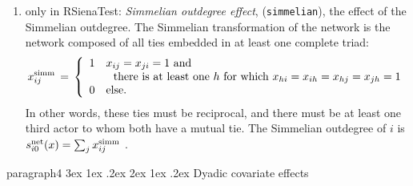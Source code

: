\documentclass[a4paper,fleqn,11pt]{article}
\makeatletter
\renewcommand\paragraph{\@startsection
   {paragraph}{4}{\z@}               %
   {3ex \@plus1ex \@minus.2ex}       %
   {2ex \@plus1ex \@minus.2ex}       %
   {\normalfont\normalsize\bfseries\itshape}}   %
\newcommand{\+}{\, + \,}
\newcommand{\vit}{\theenumi}
\newcounter{savenumi}
\makeatother
\begin{document}
\begin{enumerate}
\setcounter{enumi}{\value{savenumi}}
\item only in \textsf{RSienaTest}: \emph{Simmelian outdegree effect}, (\texttt{simmelian}), the effect of
      the Simmelian outdegree. The Simmelian transformation of the network is
      the network composed of all ties embedded in at least one complete triad:
\[
    x^{\rm{simm}}_{ij} \,=\, \left\{ \begin{array}{cl}
                               1 & x_{ij} = x_{ji} = 1 \text{ and} \\
                                  & \ \text{ there is at least one }
                                      h \text{ for which } x_{hi} = x_{ih} = x_{hj} = x_{jh} = 1 \\
                               0 & \text{else.}
                             \end{array} \right.
\]
      In other words, these ties must be reciprocal, and there must be at least one
      third actor to whom both have a mutual tie.
      The Simmelian outdegree of $i$ is  \\
$s^{\rm net}_{i\vit}(x ) = \sum_j  x^{\rm{simm}}_{ij} $ .\\

\setcounter{savenumi}{\value{enumi}}
\end{enumerate}

\paragraph{Dyadic covariate effects}
\end{document}
